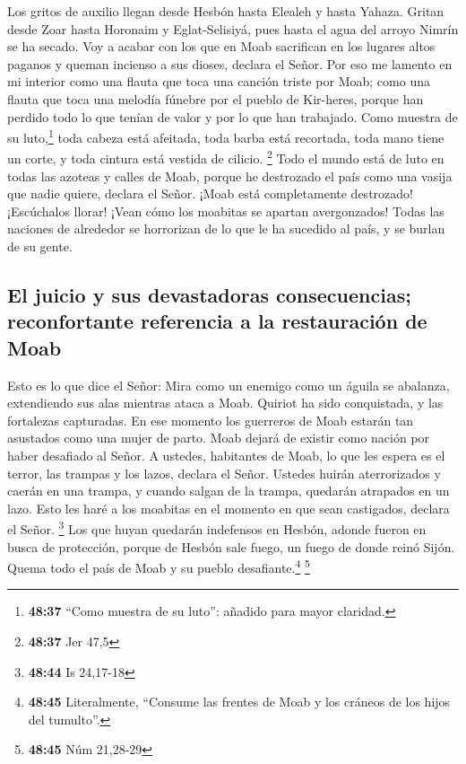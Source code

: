  Los gritos de auxilio llegan desde Hesbón hasta Elealeh
y hasta Yahaza. Gritan desde Zoar hasta Horonaim y Eglat-Selisiyá, pues
hasta el agua del arroyo Nimrín se ha secado.  Voy a
acabar con los que en Moab sacrifican en los lugares altos paganos y
queman incienso a sus dioses, declara el Señor.  Por eso
me lamento en mi interior como una flauta que toca una canción triste
por Moab; como una flauta que toca una melodía fúnebre por el pueblo de
Kir-heres, porque han perdido todo lo que tenían de valor y por lo que
han trabajado.  Como muestra de su luto,\footnote{\textbf{48:37}
  ``Como muestra de su luto'': añadido para mayor claridad.} toda cabeza
está afeitada, toda barba está recortada, toda mano tiene un corte, y
toda cintura está vestida de cilicio. \footnote{\textbf{48:37} Jer 47,5}
 Todo el mundo está de luto en todas las azoteas y calles
de Moab, porque he destrozado el país como una vasija que nadie quiere,
declara el Señor.  ¡Moab está completamente destrozado!
¡Escúchalos llorar! ¡Vean cómo los moabitas se apartan avergonzados!
Todas las naciones de alrededor se horrorizan de lo que le ha sucedido
al país, y se burlan de su gente.

\hypertarget{el-juicio-y-sus-devastadoras-consecuencias-reconfortante-referencia-a-la-restauraciuxf3n-de-moab}{%
\subsection{El juicio y sus devastadoras consecuencias; reconfortante
referencia a la restauración de
Moab}\label{el-juicio-y-sus-devastadoras-consecuencias-reconfortante-referencia-a-la-restauraciuxf3n-de-moab}}

 Esto es lo que dice el Señor: Mira como un enemigo como
un águila se abalanza, extendiendo sus alas mientras ataca a Moab.
 Quiriot ha sido conquistada, y las fortalezas
capturadas. En ese momento los guerreros de Moab estarán tan asustados
como una mujer de parto.  Moab dejará de existir como
nación por haber desafiado al Señor.  A ustedes,
habitantes de Moab, lo que les espera es el terror, las trampas y los
lazos, declara el Señor.  Ustedes huirán aterrorizados y
caerán en una trampa, y cuando salgan de la trampa, quedarán atrapados
en un lazo. Esto les haré a los moabitas en el momento en que sean
castigados, declara el Señor. \footnote{\textbf{48:44} Is 24,17-18}
 Los que huyan quedarán indefensos en Hesbón, adonde
fueron en busca de protección, porque de Hesbón sale fuego, un fuego de
donde reinó Sijón. Quema todo el país de Moab y su pueblo
desafiante.\footnote{\textbf{48:45} Literalmente, ``Consume las frentes
  de Moab y los cráneos de los hijos del tumulto''.} \footnote{\textbf{48:45}
  Núm 21,28-29}

